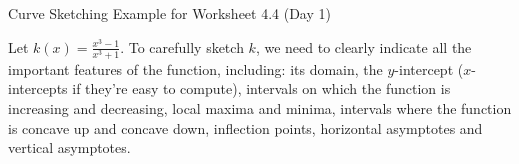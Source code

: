 \documentclass[10pt]{amsart}
\theoremstyle{definition}
\theoremstyle{remark}
\begin{document}


\begin{Large}
\begin{center}Curve Sketching Example for Worksheet 4.4 (Day 1)\end{center}\end{Large}

Let $k(x) = \frac{x^{3} - 1}{x^{3}+1}$. To carefully sketch $k$, we need to clearly  indicate all the important features of the function, including: its domain, the $y$-intercept ($x$-intercepts if they're easy to compute), intervals on which the function is increasing and decreasing, local maxima and minima, intervals where the function is concave up and concave down, inflection points, horizontal asymptotes and vertical asymptotes.
\end{document}
